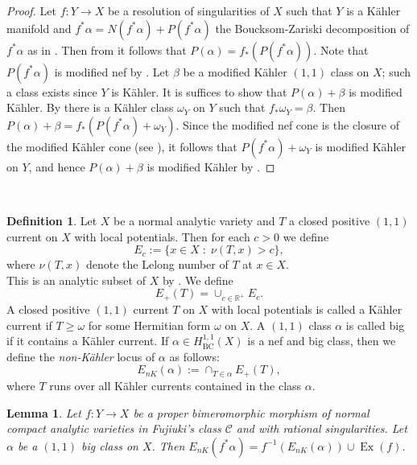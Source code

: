 \documentclass[12pt]{amsart}
\theoremstyle{plain}
\newtheorem{lemma}[theorem]{Lemma}
\theoremstyle{remark}
\theoremstyle{definition}
\def\BC{\operatorname{BC}}
\newcommand{\<}{\leq}
\def\>{\geq}
\newcommand{\mbR}{\mathbb{R}}
\def\>{\geq}
\def\mcC{\mathcal{C}}
\def\Ex{\operatorname{Ex}}
\theoremstyle{definition}
\newtheorem{definition}[theorem]{Definition}
\theoremstyle{definition}
\numberwithin{equation}{section}
\theoremstyle{remark}
\begin{document}
\begin{proof}
    Let $f:Y\to X$ be a resolution of singularities of $X$ such that $Y$ is a K\"ahler manifold and $f^*\alpha=N(f^*\alpha)+P(f^*\alpha)$ the Boucksom-Zariski decomposition of $f^*\alpha$ as in \cite[Defintion 3.7]{Bou04}. Then from \cite[Definition A.6]{DHY23} it follows that $P(\alpha)=f_*(P(f^*\alpha))$. Note that $P(f^*\alpha)$ is modified nef by \cite[Proposition 3.8(i)]{Bou04}. Let $\beta$ be a modified K\"ahler $(1,1)$ class on $X$; such a class exists since $Y$ is K\"ahler. It is suffices to show that $P(\alpha)+\beta$ is modified K\"ahler. By \cite[Proposition 2.3]{Bou04} there is a K\"ahler class $\omega_Y$ on $Y$ such that $f_*\omega_Y=\beta$. Then $P(\alpha)+\beta=f_*(P(f^*\alpha)+\omega_Y)$. Since the modified nef cone is the closure of the modified K\"ahler cone (see \cite[\S 2.7]{Bou04}), it follows that $P(f^*\alpha)+\omega_Y$ is modified K\"ahler on $Y$, and hence $P(\alpha)+\beta$ is modified K\"ahler by \cite[Proposition 2.3]{Bou04}.  
\end{proof}~\\

\begin{definition}
Let $X$ be a normal analytic variety and $T$ a closed positive $(1, 1)$ current on $X$ with local potentials. Then for each $c>0$ we define
\[ 
E_c:=\{x\in X\;:\; \nu(T, x)>c\},
\]
where $\nu(T, x)$ denote the Lelong number of $T$ at $x\in X$.\\ 
This is an analytic subset of $X$ by \cite{Siu74}. We define 
\[
E_+(T)=\cup_{c\in \mbR^+}E_c.
\]
A closed positive $(1,1)$ current $T$ on $X$ with local potentials is called a K\"ahler current if $T\>\omega$ for some Hermitian form $\omega$ on $X$. A $(1,1)$ class $\alpha$ is called big if it contains a K\"ahler current. If $\alpha\in H^{1,1}_{\BC}(X)$ is a nef and big class, then we define the \emph{non-K\"ahler} locus of $\alpha$ as follows:
\[
E_{nK}(\alpha ):=\cap_{T\in \alpha} E_+(T),
\]
where $T$ runs over all K\"ahler currents contained in the class $\alpha$.
\end{definition}

\begin{lemma}\label{lem:non-kahler-locus}
Let $f:Y\to X$ be a proper bimeromorphic morphism of normal compact analytic varieties in Fujiuki's class $\mcC$ and with rational singularities. Let $\alpha$ be a $(1,1)$ big class on $X$. Then $E_{nK}(f^*\alpha)=f^{-1}(E_{nK}(\alpha))\cup\Ex(f)$.
\end{lemma}
\end{document}
